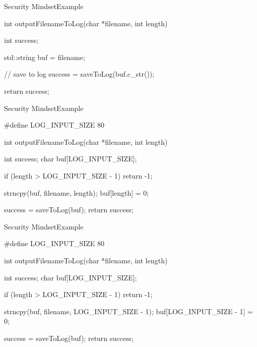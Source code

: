 \begin{slide}{Security Mindset}{Example}
  \begin{nicscolumn}
    \begin{nicsextern}[height=4cm]{}
      int outputFilenameToLog(char *filename, int length) {
        int success;

        std::string buf = filename;

        // save to log
        success = saveToLog(buf.c_str());

        return success;
      }
    \end{nicsextern}
  \end{nicscolumn}
\end{slide}

\begin{slide}{Security Mindset}{Example}
  \begin{nicscolumn}
    \begin{nicsextern}[height=6cm]{}
      #define LOG_INPUT_SIZE 80

      int outputFilenameToLog(char *filename, int length) {
        int success;
        char buf[LOG_INPUT_SIZE];

        if (length > LOG_INPUT_SIZE - 1)
          return -1;

        strncpy(buf, filename, length);
        buf[length] = 0;

        success = saveToLog(buf);
        return success;
      }
    \end{nicsextern}
  \end{nicscolumn}
\end{slide}

\begin{slide}{Security Mindset}{Example}
  \begin{nicscolumn}
    \begin{nicsextern}[height=6cm]{}
      #define LOG_INPUT_SIZE 80

      int outputFilenameToLog(char *filename, int length) {
        int success;
        char buf[LOG_INPUT_SIZE];

        if (length > LOG_INPUT_SIZE - 1)
          return -1;

        strncpy(buf, filename, LOG_INPUT_SIZE - 1);
        buf[LOG_INPUT_SIZE - 1] = 0;

        success = saveToLog(buf);
        return success;
      }
    \end{nicsextern}
  \end{nicscolumn}
\end{slide}

